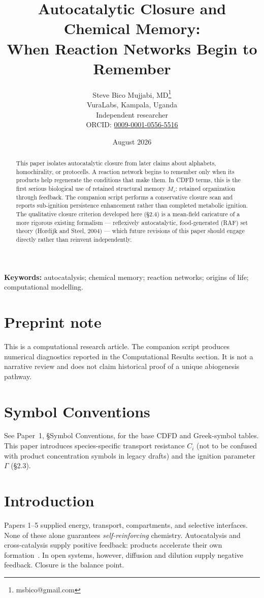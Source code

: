 \documentclass[11pt,a4paper]{article}
\title{Autocatalytic Closure and Chemical Memory:\\ When Reaction Networks Begin to Remember}
\author{Steve Bico Mujjabi, MD\thanks{msbico@gmail.com}\\
VuraLabs, Kampala, Uganda\\
Independent researcher\\
ORCID: \href{https://orcid.org/0009-0001-0556-5516}{0009-0001-0556-5516}}
\date{August 2026}
\begin{document}
\maketitle

\begin{abstract}
This paper isolates autocatalytic closure from later claims about alphabets, homochirality, or protocells. A reaction network begins to remember only when its products help regenerate the conditions that make them. In CDFD terms, this is the first serious biological use of retained structural memory $M_s$: retained organization through feedback. The companion script performs a conservative closure scan and reports sub-ignition persistence enhancement rather than completed metabolic ignition. The qualitative closure criterion developed here (\S2.4) is a mean-field caricature of a more rigorous existing formalism --- reflexively autocatalytic, food-generated (RAF) set theory (Hordijk and Steel, 2004) --- which future revisions of this paper should engage directly rather than reinvent independently.
\end{abstract}

\noindent\textbf{Keywords:} autocatalysis; chemical memory; reaction networks; origins of life; computational modelling.

\section*{Preprint note}
This is a computational research article. The companion script produces numerical diagnostics reported in the Computational Results section. It is not a narrative review and does not claim historical proof of a unique abiogenesis pathway.

\section*{Symbol Conventions}

\noindent See Paper~1, \S Symbol Conventions, for the base CDFD and Greek-symbol tables. This paper introduces species-specific transport resistance $C_i$ (not to be confused with product concentration symbols in legacy drafts) and the ignition parameter $\Gamma$ (\S2.3).

\section{Introduction}
Papers 1--5 supplied energy, transport, compartments, and selective interfaces. None of these alone guarantees \emph{self-reinforcing} chemistry. Autocatalysis and cross-catalysis supply positive feedback: products accelerate their own formation~\cite{Eigen1971,Kauffman1986}. In open systems, however, diffusion and dilution supply negative feedback. Closure is the balance point.
\end{document}
